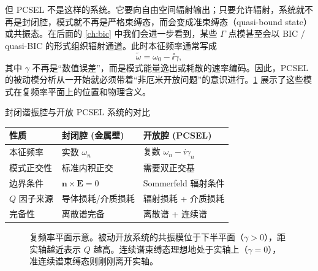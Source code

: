 但 PCSEL 不是这样的系统。它要向自由空间辐射输出；只要允许辐射，系统就不再是封闭腔，模式就不再是严格束缚态，而会变成准束缚态（quasi-bound state）或共振态。在后面的 \cref{ch:bic} 中我们会进一步看到，某些 $\Gamma$ 点模甚至会以 BIC / quasi-BIC 的形式组织辐射通道。此时本征频率通常写成
\[
\tilde{\omega}=\omega_0-\ii\gamma,
\]
其中 $\gamma$ 不再是“数值误差”，而是模式能量逸出或耗散的速率编码。因此，PCSEL 的被动模分析从一开始就必须带着“非厄米开放问题”的意识进行。\cref{fig:complex-freq-plane} 展示了这些模式在复频率平面上的位置和物理含义。
\begin{ComparisonBox}{封闭谐振腔与开放 PCSEL 系统的对比}
  \begin{center}
  \begin{tabular}{l l l}
    \toprule
    性质 & 封闭腔 (金属壁) & 开放腔 (PCSEL) \\
    \midrule
    本征频率 & 实数 $\omega_n$ & 复数 $\omega_n-i\gamma_n$ \\
    模式正交性 & 标准内积正交 & 需要双正交基 \\
    边界条件 & $\bm{n}\times\bm{E}=0$ & Sommerfeld 辐射条件 \\
    $Q$ 因子来源 & 导体损耗/介质损耗 & 辐射损耗 + 介质损耗 \\
    完备性 & 离散谱完备 & 离散谱 + 连续谱 \\
    \bottomrule
  \end{tabular}
  \end{center}
\end{ComparisonBox}
\begin{figure}[htbp]
  \centering
  \caption{复频率平面示意。被动开放系统的共振模位于下半平面（$\gamma>0$），距实轴越近表示 $Q$ 越高。连续谱束缚态理想地处于实轴上（$\gamma=0$），准连续谱束缚态则刚刚离开实轴。}
  \label{fig:complex-freq-plane}
\end{figure}

